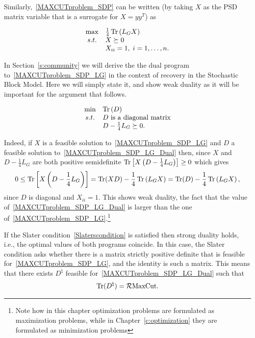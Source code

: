 Similarly,~\eqref{MAXCUTproblem_SDP} can be written (by taking $X$ as the PSD matrix variable that is a surrogate for $X=yy^T$) as

\begin{equation}\label{MAXCUTproblem_SDP_LG} 
\begin{array}{cl}
\max &\frac14 \operatorname{Tr}\left( L_G X\right) \\
s.t. & X\succeq 0 \\
 & X_{ii}=1,\; i=1,\ldots,n.
\end{array}
\end{equation}

In Section~\ref{s:community} we will derive the the dual program to~\eqref{MAXCUTproblem_SDP_LG} in the context of recovery in the Stochastic Block Model. Here we will simply state it, and show weak duality as it will be important for the argument that follows.

\begin{equation}\label{MAXCUTproblem_SDP_LG_Dual} 
\begin{array}{cl}
\min & \operatorname{Tr}\left( D \right)\\
s.t. & D \text{ is a diagonal matrix}\\
 & D - \frac14 L_G \succeq 0.
\end{array}
\end{equation}

Indeed, if $X$ is a feasible solution to~\eqref{MAXCUTproblem_SDP_LG} and $D$ a feasible solution to~\eqref{MAXCUTproblem_SDP_LG_Dual} then, since $X$ and $D - \frac14 L_G$ are both positive semidefinite $\operatorname{Tr}\left[ X\left( D - \frac14 L_G \right)  \right] \geq 0$ which gives
\[
0 \leq \operatorname{Tr}\left[ X\left( D - \frac14 L_G \right)  \right] = \operatorname{Tr}(XD) - \frac14\operatorname{Tr}\left( L_G X \right) = \operatorname{Tr}(D) - \frac14\operatorname{Tr}\left( L_G X \right),
\]
since $D$ is diagonal and $X_{ii}=1$. This shows weak duality, the fact that the value of~\eqref{MAXCUTproblem_SDP_LG_Dual} is larger than the one of~\eqref{MAXCUTproblem_SDP_LG}.\footnote{Note how in this chapter optimization problems are formulated as maximization problems, while in Chapter~\ref{c:optimization} they are formulated as minimization problems}

If the Slater condition~\eqref{Slaterscondition} is satisfied then strong duality holds, i.e., the optimal values of both programs coincide. In this case, the Slater condition asks whether there is a matrix strictly positive definite that is feasible for~\eqref{MAXCUTproblem_SDP_LG}, and the identity is such a matrix. This means that there exists $D^{\natural}$ feasible for~\eqref{MAXCUTproblem_SDP_LG_Dual} such that
\[
\operatorname{Tr}(D^{\natural}) = \mathcal{R}\mathrm{MaxCut}.
\]

